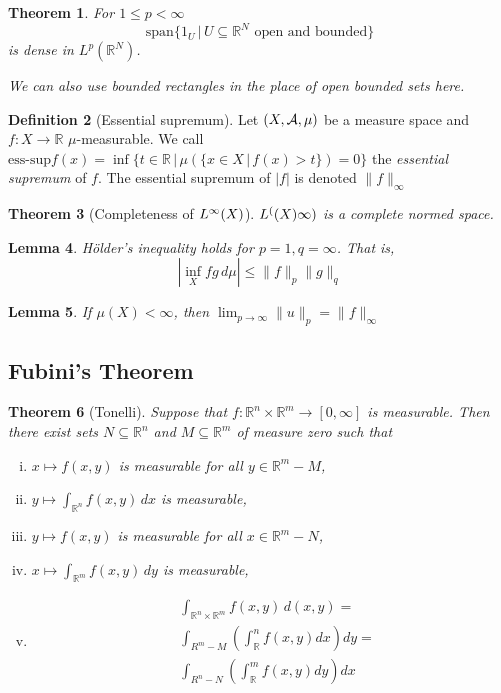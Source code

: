 \documentclass[10pt, oneside, reqno]{amsart}
\theoremstyle{plain}%
\newtheorem{thm}{Theorem}[section]
\newtheorem{lem}[thm]{Lemma}
\theoremstyle{definition}
\newtheorem{defn}[thm]{Definition}
\theoremstyle{remark}
\newcommand{\R}{\mathbb{R}}
\newcommand{\dmu}{\, d \mu}
\begin{document}
\begin{thm}
    For $1 \leq p < \infty$
    \[
        \text{span} \{1_U \, | \, U \subseteq \R^N \text{ open and bounded} \}
    \] is dense in $L^p(\R^N)$.  
    
    We can also use bounded rectangles in the place of open bounded sets here.
\end{thm}

\begin{defn}[Essential supremum]
    Let $(X, \mathcal{A}, \mu)$ be a measure space and $f : X \rightarrow \R$ $\mu$-measurable.  We call $\text{ess-sup} f(x) = \inf \{ t \in \R \, | \, \mu(\{ x \in X \, | \, f(x) > t \} ) = 0 \}$ the \emph{essential supremum} of $f$.  The essential supremum of $|f|$ is denoted $\| f \|_\infty$
\end{defn}

\begin{thm}[Completeness of $L^{\infty}(X)$]
    $L^{(}(X)\infty)$ is a complete normed space.
\end{thm}

\begin{lem}
    H\"older's inequality holds for $p = 1, q = \infty$.  That is, \[
        | \inf_X fg \dmu | \leq \|f \|_p \|g \|_q
    \]
\end{lem}

\begin{lem}
    If $\mu(X) < \infty$, then $\lim_{p \rightarrow \infty} \|u\|_p = \|f\|_\infty$
\end{lem}


\subsection{Fubini's Theorem} %
\label{sub:fubini_s_theorem}

\begin{thm}[Tonelli]\label{tonelli}
    Suppose that $f: \R^n \times \R^m \rightarrow [0,\infty]$ is measurable. Then there exist sets $N \subseteq \R^n$ and $M \subseteq \R^m$ of measure zero such that 
    
    \begin{enumerate}[(i)]
        \item $x \mapsto f(x,y)$ is measurable for all $y \in \R^m - M$,
        \item $y \mapsto \int_{\R^n} f(x,y) \, dx$ is measurable,
        \item $y \mapsto f(x,y)$ is measurable for all $x \in \R^m - N$,
        \item $x \mapsto \int_{\R^m} f(x,y) \, dy$ is measurable,
        \item  \begin{align*}
            &\int_{\R^n \times \R^m}f(x,y)\, d(x,y) = \\
            &\int_{R^m-M} \left( \int_\R^n f(x,y) dx \right) dy = \\
            &\int_{R^n-N} \left( \int_\R^m f(x,y) dy \right) dx
        \end{align*}
    \end{enumerate}
\end{thm}
\end{document}
